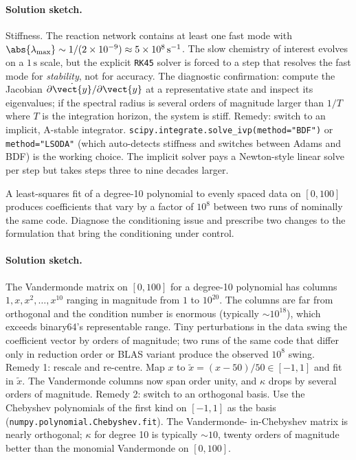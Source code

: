 \paragraph{Solution sketch.}
Stiffness. The reaction network contains at least one fast mode
with $\abs{\lambda_{\max}} \sim 1/(2 \times 10^{-9})
\approx 5 \times 10^{8} \,\text{s}^{-1}$. The slow chemistry of
interest evolves on a $1 \,\text{s}$ scale, but the explicit
\texttt{RK45} solver is forced to a step that resolves the fast
mode for \emph{stability}, not for accuracy. The diagnostic
confirmation: compute the Jacobian $\partial \dot{\vect{y}}/
\partial \vect{y}$ at a representative state and inspect its
eigenvalues; if the spectral radius is several orders of magnitude
larger than $1/T$ where $T$ is the integration horizon, the
system is stiff. Remedy: switch to an implicit, A-stable
integrator. \texttt{scipy.integrate.solve\_ivp(method="BDF")} or
\texttt{method="LSODA"} (which auto-detects stiffness and
switches between Adams and BDF) is the working choice. The
implicit solver pays a Newton-style linear solve per step but
takes steps three to nine decades larger.

\begin{exercise}
A least-squares fit of a degree-10 polynomial to evenly spaced
data on $[0, 100]$ produces coefficients that vary by a factor of
$10^{8}$ between two runs of nominally the same code. Diagnose
the conditioning issue and prescribe two changes to the
formulation that bring the conditioning under control.
\end{exercise}

\paragraph{Solution sketch.}
The Vandermonde matrix on $[0, 100]$ for a degree-10 polynomial
has columns $1, x, x^{2}, \ldots, x^{10}$ ranging in magnitude
from $1$ to $10^{20}$. The columns are far from orthogonal and
the condition number is enormous (typically $\sim 10^{18}$),
which exceeds binary64's representable range. Tiny perturbations
in the data swing the coefficient vector by orders of magnitude;
two runs of the same code that differ only in reduction order or
BLAS variant produce the observed $10^{8}$ swing.
Remedy 1: rescale and re-centre. Map $x$ to $\tilde x =
(x - 50)/50 \in [-1, 1]$ and fit in $\tilde x$. The Vandermonde
columns now span order unity, and $\kappa$ drops by several
orders of magnitude.
Remedy 2: switch to an orthogonal basis. Use the Chebyshev
polynomials of the first kind on $[-1, 1]$ as the basis
(\texttt{numpy.polynomial.Chebyshev.fit}). The Vandermonde-
in-Chebyshev matrix is nearly orthogonal; $\kappa$ for degree 10
is typically $\sim 10$, twenty orders of magnitude better than
the monomial Vandermonde on $[0, 100]$.

